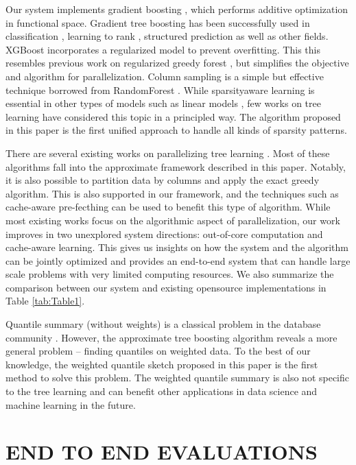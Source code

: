 \documentclass[sigconf]{acmart}
\begin{document}
Our system implements gradient boosting \cite{friedman2001greedy}, which performs additive optimization in functional space. Gradient
tree boosting has been successfully used in classification \cite{friedman2000additive}, learning to rank \cite{burges2010ranknet}, structured prediction \cite{chen2015efficient} as well 
as other fields. XGBoost incorporates a regularized model to prevent overfitting. This this resembles previous work on 
regularized greedy forest \cite{johnson2013learning}, but simplifies the objective and algorithm for parallelization. Column sampling is a 
simple but effective technique borrowed from RandomForest \cite{breiman2001random}. While sparsityaware learning is essential in other types 
of models such as linear models \cite{fan1871library}, few works on tree learning have considered this topic in a principled way. The 
algorithm proposed in this paper is the first unified approach to handle all kinds of sparsity patterns.

There are several existing works on parallelizing tree learning \cite{tyree2011parallel, panda2009planet}. Most of these algorithms fall into the 
approximate framework described in this paper. Notably, it is also possible to partition data by columns \cite{ye2009stochastic} and apply 
the exact greedy algorithm. This is also supported in our framework, and the techniques such as cache-aware pre-fecthing
can be used to benefit this type of algorithm. While most existing works focus on the algorithmic aspect of 
parallelization, our work improves in two unexplored system directions: out-of-core computation and cache-aware learning. 
This gives us insights on how the system and the algorithm can be jointly optimized and provides an end-to-end system that
can handle large scale problems with very limited computing resources. We also summarize the comparison between our
system and existing opensource implementations in Table \ref{tab:Table1}.

Quantile summary (without weights) is a classical problem in the database community \cite{greenwald2001space, zhang2007fast}. However, the approximate tree
boosting algorithm reveals a more general problem – finding quantiles on weighted data. To the best
of our knowledge, the weighted quantile sketch proposed in this paper is the first method to solve this problem. The
weighted quantile summary is also not specific to the tree learning and can benefit other applications in data science
and machine learning in the future.

\section{END TO END EVALUATIONS}
\label{sec:END TO END EVALUATIONS}
\end{document}

